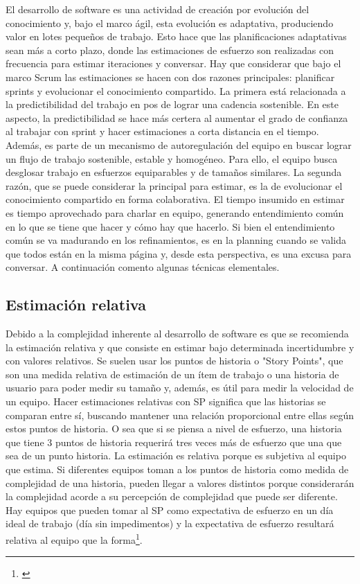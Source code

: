 El desarrollo de software es una actividad de creación por evolución del conocimiento y, bajo el marco ágil, esta evolución es adaptativa, produciendo valor en lotes pequeños de trabajo. Esto hace que las planificaciones adaptativas sean más a corto plazo, donde las estimaciones de esfuerzo son realizadas con frecuencia para estimar iteraciones y conversar. Hay que considerar que bajo el marco Scrum las estimaciones se hacen con dos razones principales: planificar sprints y evolucionar el conocimiento compartido. La primera está relacionada a la predictibilidad del trabajo en pos de lograr una cadencia sostenible. En este aspecto, la predictibilidad se hace más certera al aumentar el grado de confianza al trabajar con sprint y hacer estimaciones a corta distancia en el tiempo. Además, es parte de un mecanismo de autoregulación del equipo en buscar lograr un flujo de trabajo sostenible, estable y homogéneo. Para ello, el equipo busca desglosar trabajo en esfuerzos equiparables y de tamaños similares. La segunda razón, que se puede considerar la principal para estimar, es la de evolucionar el conocimiento compartido en forma colaborativa. El tiempo insumido en estimar es tiempo aprovechado para charlar en equipo, generando entendimiento común en lo que se tiene que hacer y cómo hay que hacerlo. Si bien el entendimiento común se va madurando en los refinamientos, es en la planning cuando se valida que todos están en la misma página y, desde esta perspectiva, es una excusa para conversar. A continuación comento algunas técnicas elementales.

\subsection{Estimación relativa}

Debido a la complejidad inherente al desarrollo de software es que se recomienda la estimación relativa y que consiste en estimar bajo determinada incertidumbre y con valores relativos. Se suelen usar los puntos de historia o "Story Points", que son una medida relativa de estimación de un ítem de trabajo o una historia de usuario para poder medir su tamaño y, además, es útil para medir la velocidad de un equipo. Hacer estimaciones relativas con SP significa que las historias se comparan entre sí, buscando mantener una relación proporcional entre ellas según estos puntos de historia. O sea que si se piensa a nivel de esfuerzo, una historia que tiene 3 puntos de historia requerirá tres veces más de esfuerzo que una que sea de un punto historia.
La estimación es relativa porque es subjetiva al equipo que estima. Si diferentes equipos toman a los puntos de historia como medida de complejidad de una historia, pueden llegar a valores distintos porque considerarán la complejidad acorde a su percepción de complejidad que puede ser diferente. Hay equipos que pueden tomar al SP como expectativa de esfuerzo en un día ideal de trabajo (día sin impedimentos) y la expectativa de esfuerzo resultará relativa al equipo que la forma\footnote{\cite{Cohn-2004}}.

